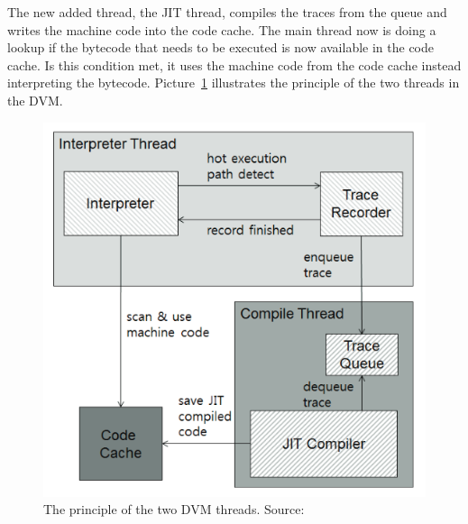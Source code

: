 The new added thread, the JIT thread, compiles the traces from the queue and writes the machine code into the code cache.
The main thread now is doing a lookup if the bytecode that needs to be executed is now available in the code cache.
Is this condition met, it uses the machine code from the code cache instead interpreting the bytecode.\cite{oh2012evaluation}
Picture~\ref{fig:dvm-threads} illustrates the principle of the two threads in the DVM.\\
\begin{figure}[h]
\begin{center}
\includegraphics[scale=0.5]{images/dvm-threads.png} 
\caption{The principle of the two DVM threads. Source:\cite{oh2012evaluation}}
\label{fig:dvm-threads}
\end{center}
\end{figure}

